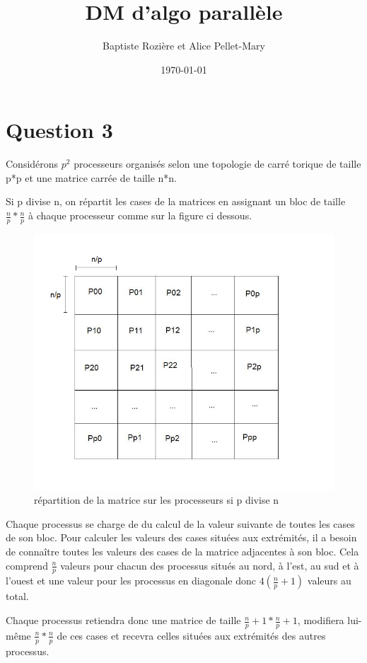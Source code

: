 \documentclass[a4paper,11pt]{article}
\title{DM d'algo parallèle}
\author{Baptiste Rozière et Alice Pellet-Mary}
\date{\today}
\begin{document}
\maketitle

\section*{Question 3}
Considérons $p^2$ processeurs organisés selon une topologie de carré torique de taille p*p et une matrice carrée de taille n*n.

Si p divise n, on répartit les cases de la matrices en assignant un bloc de taille $\frac n p * \frac n p$ à chaque processeur comme sur la figure ci dessous.
\begin{figure}[!h]
  \includegraphics[scale=0.4]{repartition.png}
  \caption{répartition de la matrice sur les processeurs si p divise n}
  \label{repartition}
\end{figure}

Chaque processus se charge de du calcul de la valeur suivante de toutes les cases de son bloc. Pour calculer les valeurs des cases situées aux extrémités, il a besoin de connaître toutes les valeurs des cases de la matrice adjacentes à son bloc. Cela comprend $\frac n {p}$ valeurs pour chacun des processus situés au nord, à l'est, au sud et à l'ouest et une valeur pour les processus en diagonale donc $4 (\frac{n} {p}+1)$ valeurs au total. 

Chaque processus retiendra donc une matrice de taille  $\frac n p +1* \frac n p +1$, modifiera lui-même $\frac n p * \frac n p$ de ces cases et recevra celles situées aux extrémités des autres processus.
\end{document}
